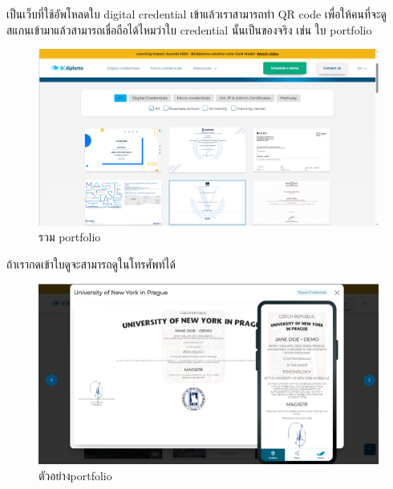 เป็นเว็บที่ใช้อัพโหลดใบ digital credential เข้าแล้วเราสามารถทำ QR code เพื่อให้คนที่จะดูสแกนเข้ามาแล้วสามารถเชื่อถือได้ไหมว่าใบ credential นั้นเป็นของจริง เช่น ใบ portfolio

\graphicspath{ {./images/} }
\begin{figure}[htbp]
  \centering 
  \includegraphics[scale=0.3]{bcdiploma_1.png}
  \caption[portfolio]{รวม portfolio}
  \label{bcdiploma_1}
\end{figure}

ถ้าเรากดเข้าใบดูจะสามารถดูในโทรศัพท์ได้

\graphicspath{ {./images/} }
\begin{figure}[htbp]
  \centering 
  \includegraphics[scale=0.3]{bcdiploma_2.png}
  \caption[ตัวอย่าง portfolio]{ตัวอย่างportfolio}
  \label{bcdiploma_2}
\end{figure}

